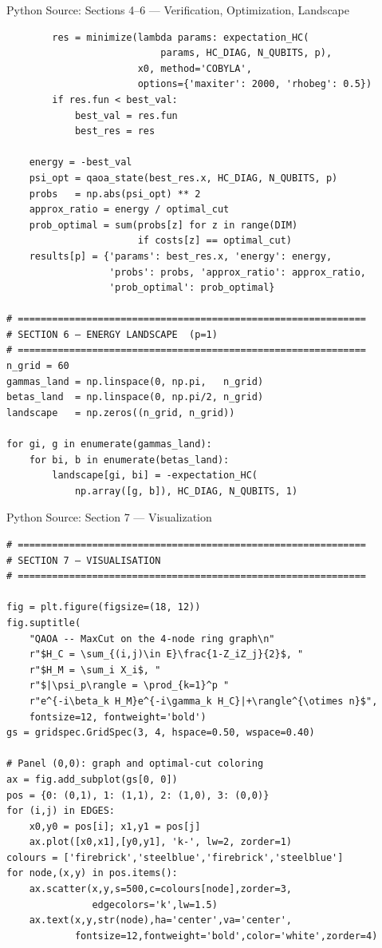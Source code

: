 \documentclass{beamer}
\begin{document}
\begin{frame}
\begin{frame}{Python Source: Sections 4--6 — Verification, Optimization, Landscape}
\begin{verbatim}
        res = minimize(lambda params: expectation_HC(
                           params, HC_DIAG, N_QUBITS, p),
                       x0, method='COBYLA',
                       options={'maxiter': 2000, 'rhobeg': 0.5})
        if res.fun < best_val:
            best_val = res.fun
            best_res = res

    energy = -best_val
    psi_opt = qaoa_state(best_res.x, HC_DIAG, N_QUBITS, p)
    probs   = np.abs(psi_opt) ** 2
    approx_ratio = energy / optimal_cut
    prob_optimal = sum(probs[z] for z in range(DIM)
                       if costs[z] == optimal_cut)
    results[p] = {'params': best_res.x, 'energy': energy,
                  'probs': probs, 'approx_ratio': approx_ratio,
                  'prob_optimal': prob_optimal}

# =============================================================
# SECTION 6 — ENERGY LANDSCAPE  (p=1)
# =============================================================
n_grid = 60
gammas_land = np.linspace(0, np.pi,   n_grid)
betas_land  = np.linspace(0, np.pi/2, n_grid)
landscape   = np.zeros((n_grid, n_grid))

for gi, g in enumerate(gammas_land):
    for bi, b in enumerate(betas_land):
        landscape[gi, bi] = -expectation_HC(
            np.array([g, b]), HC_DIAG, N_QUBITS, 1)
\end{verbatim}
\end{frame}


\begin{frame}{Python Source: Section 7 — Visualization}
\footnotesize
\begin{verbatim}
# =============================================================
# SECTION 7 — VISUALISATION
# =============================================================

fig = plt.figure(figsize=(18, 12))
fig.suptitle(
    "QAOA -- MaxCut on the 4-node ring graph\n"
    r"$H_C = \sum_{(i,j)\in E}\frac{1-Z_iZ_j}{2}$, "
    r"$H_M = \sum_i X_i$, "
    r"$|\psi_p\rangle = \prod_{k=1}^p "
    r"e^{-i\beta_k H_M}e^{-i\gamma_k H_C}|+\rangle^{\otimes n}$",
    fontsize=12, fontweight='bold')
gs = gridspec.GridSpec(3, 4, hspace=0.50, wspace=0.40)

# Panel (0,0): graph and optimal-cut coloring
ax = fig.add_subplot(gs[0, 0])
pos = {0: (0,1), 1: (1,1), 2: (1,0), 3: (0,0)}
for (i,j) in EDGES:
    x0,y0 = pos[i]; x1,y1 = pos[j]
    ax.plot([x0,x1],[y0,y1], 'k-', lw=2, zorder=1)
colours = ['firebrick','steelblue','firebrick','steelblue']
for node,(x,y) in pos.items():
    ax.scatter(x,y,s=500,c=colours[node],zorder=3,
               edgecolors='k',lw=1.5)
    ax.text(x,y,str(node),ha='center',va='center',
            fontsize=12,fontweight='bold',color='white',zorder=4)


\end{verbatim}
\end{frame}
\end{frame}
\end{document}
